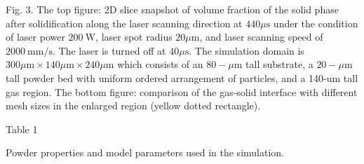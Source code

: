 \documentclass[10pt]{article}
\begin{document}
Fig. 3. The top figure: 2D slice snapshot of volume fraction of the solid phase after solidification along the laser scanning direction at $440 \mu \mathrm{s}$ under the condition of laser power $200 \mathrm{~W}$, laser spot radius $20 \mu \mathrm{m}$, and laser scanning speed of $2000 \mathrm{~mm} / \mathrm{s}$. The laser is turned off at $40 \mu \mathrm{s}$. The simulation domain is $300 \mu \mathrm{m} \times 140 \mu \mathrm{m} \times 240 \mu \mathrm{m}$ which consists of an $80-\mu \mathrm{m}$ tall substrate, a $20-\mu \mathrm{m}$ tall powder bed with uniform ordered arrangement of particles, and a 140-um tall gas region. The bottom figure: comparison of the gas-solid interface with different mesh sizes in the enlarged region (yellow dotted rectangle).

Table 1

Powder properties and model parameters used in the simulation.
\end{document}
